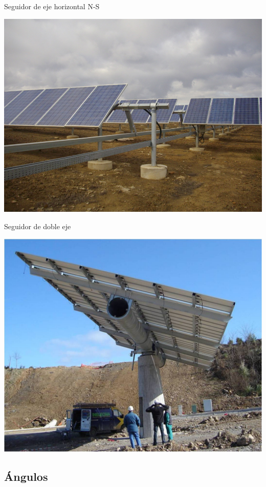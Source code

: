 \documentclass[xcolor={usenames,svgnames,dvipsnames}]{beamer}
\begin{document}
\begin{frame}[label={sec:orgd072c7b}]{Seguidor de eje horizontal N-S}
\begin{center}
\includegraphics[width=.9\linewidth]{../figs/SeguidorEjeHorizontal.jpg}
\end{center}
\end{frame}


\begin{frame}[label={sec:org2486e4e}]{Seguidor de doble eje}
\begin{center}
\includegraphics[width=.9\linewidth]{../figs/SeguidorReocin.jpg}
\end{center}
\end{frame}


\subsection{Ángulos}
\label{sec:orgae38762}
\end{document}
